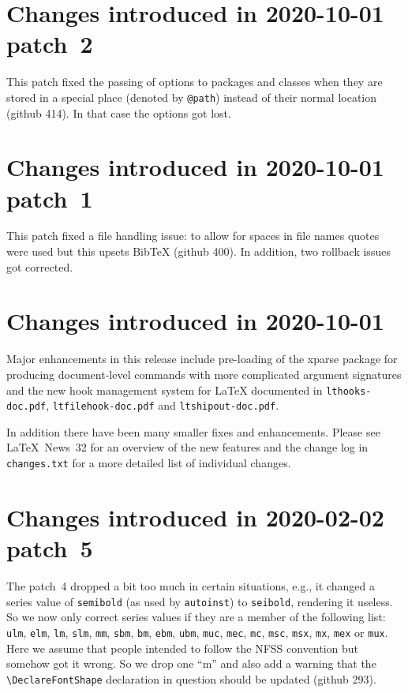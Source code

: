 \documentclass{ltxguide}
\newcommand\Lpack[1]{\mbox{\textsf{#1}}}
\newcommand\ghissue[1]{github #1}
\newcommand\ltnewsissue[1]{\LaTeX\ News~#1}
\newcommand\ghissue[1]{%
    \href{https://github.com/latex3/latex2e/issues/#1}{github #1}}
\newcommand\ltnewsissue[1]{%
    \href{https://www.latex-project.org/news/latex2e-news/ltnews#1.pdf}{\LaTeX\ News~#1}}
\begin{document}
\section{Changes introduced in 2020-10-01 patch~2}

This patch fixed the passing of options to packages and classes when
they are stored in a special place (denoted by \verb=@path=)
instead of their normal location (\ghissue{414}). In that case the
options got lost.

\section{Changes introduced in 2020-10-01 patch~1}

This patch fixed a file handling issue: to allow for spaces in file
names quotes were used but this upsets Bib\TeX{} (\ghissue{400}).  In
addition, two rollback issues got corrected.

\section{Changes introduced in 2020-10-01}

Major enhancements in this release include pre-loading of the
\Lpack{xparse} package for producing document-level commands with more
complicated argument signatures and the new hook management system for
\LaTeX{} documented in \texttt{lthooks-doc.pdf},
\texttt{ltfilehook-doc.pdf} and \texttt{ltshipout-doc.pdf}.

In addition there have been many smaller fixes and enhancements.
Please see \ltnewsissue{32} for an overview of the new features and
the change log in \texttt{changes.txt} for a more detailed list of
individual changes.

\section{Changes introduced in 2020-02-02 patch~5}

The patch~4 dropped a bit too much in certain situations, e.g., it
changed a series value of \texttt{semibold} (as used by
\texttt{autoinst}) to \texttt{seibold}, rendering it useless. So we
now only correct series values if they are a member of the
following list: \texttt{ulm}, \texttt{elm}, \texttt{lm}, \texttt{slm},
\texttt{mm}, \texttt{sbm}, \texttt{bm}, \texttt{ebm}, \texttt{ubm},
\texttt{muc}, \texttt{mec}, \texttt{mc}, \texttt{msc}, \texttt{msx},
\texttt{mx}, \texttt{mex} or \texttt{mux}. Here we assume that people
intended to follow the NFSS convention but somehow got it wrong. So we
drop one ``m'' and also add a warning that the
\verb=\DeclareFontShape= declaration in question should be updated
(\ghissue{293}).
\end{document}
